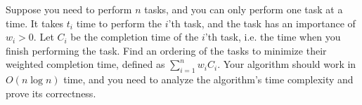 \problem{}
Suppose you need to perform $n$ tasks, and you can only perform one task at a time.  It takes $t_i$ time to perform the $i$'th task, and the task has an importance of $w_i > 0$.  Let $C_i$ be the completion time of the $i$'th task, i.e. the time when you finish performing the task.  Find an ordering of the tasks to minimize their weighted completion time, defined as $\sum_{i=1}^{n} w_i  C_i$.  Your algorithm should work in $O(n\log{n})$ time, and you need to analyze the algorithm's time complexity and prove its correctness. 

\solution{}

\newpage
